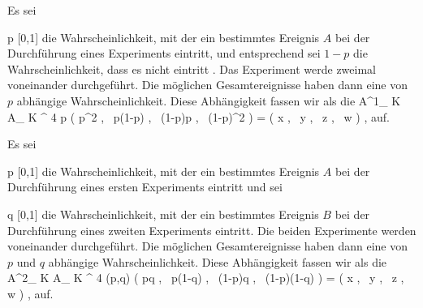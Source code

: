 {}
{





Es sei

\mavergleichskette
{\vergleichskette
{ p
}
{ \in }{ [0,1]
}
{  }{
}
{    }{
}
{   }{
}
}
{}{}{}
die Wahrscheinlichkeit, mit der ein bestimmtes Ereignis $A$  bei der Durchführung eines Experiments eintritt, und entsprechend sei $1-p$ die Wahrscheinlichkeit, dass es nicht eintritt
 {} {.}
Das Experiment werde zweimal
voneinander durchgeführt. Die möglichen Gesamtereignisse
 haben dann eine von $p$ abhängige Wahrscheinlichkeit. Diese Abhängigkeit fassen wir als die
\maabbeledisp {\varphi} { {\mathbb A}^{1}_{ K }  } { { {\mathbb A}_{  K  }^{  4   } }
} { p } { \left(  p^2  , \,   p(1-p)  , \,   (1-p)p , \,   (1-p)^2                \right) = \left(  x  , \,   y  , \,   z , \,   w                \right)
} {,}
auf.





}
{} {}

{}
{





Es sei

\mavergleichskette
{\vergleichskette
{ p
}
{ \in }{ [0,1]
}
{  }{
}
{    }{
}
{   }{
}
}
{}{}{}
die Wahrscheinlichkeit, mit der ein bestimmtes Ereignis $A$ bei der Durchführung eines ersten Experiments eintritt und  sei

\mavergleichskette
{\vergleichskette
{ q
}
{ \in }{ [0,1]
}
{  }{
}
{    }{
}
{   }{
}
}
{}{}{}
die Wahrscheinlichkeit, mit der ein bestimmtes Ereignis $B$ bei der Durchführung eines zweiten Experiments eintritt. Die beiden Experimente werden
voneinander durchgeführt. Die möglichen Gesamtereignisse
 haben dann eine von $p$ und $q$ abhängige Wahrscheinlichkeit. Diese Abhängigkeit fassen wir als die
\maabbelementzeiledisplay {\varphi} { {\mathbb A}^{2}_{ K }  } { { {\mathbb A}_{  K  }^{  4   } }
} {(p,q)} { \left(  pq  , \,   p(1-q)  , \,   (1-p)q , \,   (1-p)(1-q)                \right) = \left(  x  , \,   y  , \,   z , \,   w                \right)
} {,}
auf.





}
{} {}

